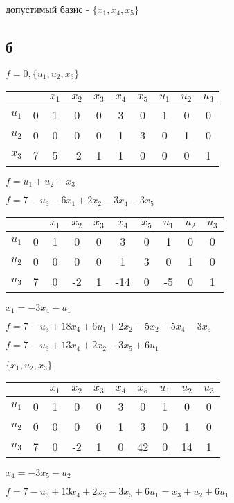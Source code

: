 \documentclass[russian]{article}
\begin{document}
допустимый базис - $\{x_1, x_4, x_5\}$

\subsection*{б}

$f=0,\{u_1, u_2, x_3\}$

\begin{tabular}{|c|c|cccccccc|} \hline
 & & $x_1$ & $x_2$ & $x_3$ & $x_4$ & $x_5$ & $u_1$ & $u_2$ & $u_3$ \\\hline
$u_1$ & 0 & 1 & 0 & 0 & 3 & 0 & 1 & 0 & 0 \\
$u_2$ & 0 & 0 & 0 & 0 & 1 & 3 & 0 & 1 & 0 \\
$x_3$ & 7 & 5 & -2 & 1 & 1 & 0 & 0 & 0 & 1 \\\hline
\end{tabular}

$f=u_1 + u_2 + x_3$

$f=7 - u_3 - 6 x_1 + 2 x_2 - 3 x_4 - 3 x_5 $

\begin{tabular}{|c|c|cccccccc|} \hline
 & & $x_1$ & $x_2$ & $x_3$ & $x_4$ & $x_5$ & $u_1$ & $u_2$ & $u_3$ \\\hline
$u_1$ & 0 & 1 & 0 & 0 & 3 & 0 & 1 & 0 & 0 \\
$u_2$ & 0 & 0 & 0 & 0 & 1 & 3 & 0 & 1 & 0 \\
$u_3$ & 7 & 0 & -2 & 1 & -14 & 0 & -5 & 0 & 1 \\\hline
\end{tabular}

$x_1 = -3 x_4 - u_1 $

$f = 7 - u_3 + 18 x_4 + 6 u_1 + 2 x_2 - 5 x_2 - 5 x_4 - 3 x_5$

$f = 7 - u_3 + 13 x_4 + 2 x_2 - 3 x_5 + 6 u_1$

$\{x_1, u_2, x_3\}$

\begin{tabular}{|c|c|cccccccc|} \hline
 & & $x_1$ & $x_2$ & $x_3$ & $x_4$ & $x_5$ & $u_1$ & $u_2$ & $u_3$ \\\hline
$u_1$ & 0 & 1 & 0 & 0 & 3 & 0 & 1 & 0 & 0 \\
$u_2$ & 0 & 0 & 0 & 0 & 1 & 3 & 0 & 1 & 0 \\
$u_3$ & 7 & 0 & -2 & 1 & 0 & 42 & 0 & 14 & 1 \\\hline
\end{tabular}

$x_4 = -3 x_5 - u_2$

$f=7-u_3 + 13 x_4 + 2 x_2 - 3 x_5 + 6 u_1 = x_3 + u_2 + 6 u_1$
\end{document}

